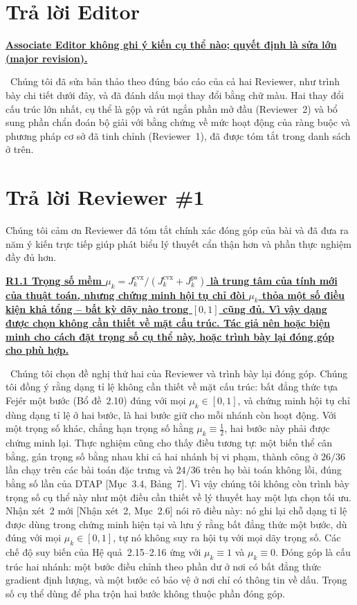 \documentclass[11pt]{article}
\newcommand{\response}[1]{\smallskip\noindent{\color{blue!60!black}\textbf{Trả lời.}}\ #1\par\medskip}
\newcommand{\loc}[1]{\textcolor{blue!50!black}{[#1]}}
\newenvironment{point}[1]{\medskip\noindent\textbf{\uline{#1}}\par}{\par}
\begin{document}
\section*{Trả lời Editor}

\begin{point}{Associate Editor không ghi ý kiến cụ thể nào; quyết định là sửa lớn (major
revision).}
\response{Chúng tôi đã sửa bản thảo theo đúng báo cáo của cả hai Reviewer,
như trình bày chi tiết dưới đây, và đã đánh dấu mọi thay đổi bằng chữ màu. Hai thay đổi cấu trúc lớn nhất, cụ thể là gộp và rút ngắn phần mở đầu (Reviewer~2) và bổ sung phần chẩn đoán bộ giải với bằng chứng về mức hoạt động của ràng buộc và phương pháp cơ sở đã tinh chỉnh (Reviewer~1), đã được tóm tắt trong danh sách ở trên.}
\end{point}

\section*{Trả lời Reviewer \#1}

\noindent Chúng tôi cảm ơn Reviewer đã tóm tắt chính xác đóng góp của bài và đã đưa ra năm
ý kiến trực tiếp giúp phát biểu lý thuyết cẩn thận hơn và phần thực nghiệm
đầy đủ hơn.

\begin{point}{R1.1 Trọng số mềm $\mu_k=J_k^{\mathrm{cvx}}/(J_k^{\mathrm{cvx}}+J_k^{\mathrm{ps}})$
là trung tâm của tính mới của thuật toán, nhưng chứng minh hội tụ chỉ đòi $\mu_k$
thỏa một số điều kiện khả tổng -- bất kỳ dãy nào trong $[0,1]$ cũng đủ. Vì vậy dạng
được chọn không cần thiết về mặt cấu trúc. Tác giả nên hoặc biện minh cho cách đặt trọng số
cụ thể này, hoặc trình bày lại đóng góp cho phù hợp.}
\response{Chúng tôi chọn đề nghị thứ hai của Reviewer và trình bày lại đóng góp.
Chúng tôi đồng ý rằng dạng tỉ lệ không cần thiết về mặt cấu trúc: bất đẳng thức
tựa Fej\'er một bước (Bổ đề~2.10) đúng với mọi $\mu_k\in[0,1]$, và chứng minh hội tụ chỉ dùng dạng tỉ lệ ở hai bước, là hai bước giữ cho mỗi nhánh còn hoạt động. Với một trọng số khác, chẳng hạn trọng số hằng $\mu_k\equiv\tfrac12$, hai bước này phải được chứng minh lại. Thực nghiệm cũng cho thấy điều tương tự: một biến thể cân bằng, gán
trọng số bằng nhau khi cả hai nhánh bị vi phạm, thành công ở $26/36$ lần chạy trên các bài toán
đặc trưng và $24/36$ trên họ bài toán không lồi, đúng bằng số lần của DTAP \loc{Mục~3.4,
Bảng~7}. Vì vậy chúng tôi không còn trình bày trọng số cụ thể này như một điều cần thiết về lý thuyết hay
một lựa chọn tối ưu. Nhận xét~2 mới \loc{Nhận xét~2, Mục~2.6} nói rõ điều này: nó ghi lại chỗ
dạng tỉ lệ được dùng trong chứng minh hiện tại và lưu ý rằng bất đẳng thức một bước,
dù đúng với mọi $\mu_k\in[0,1]$, tự nó không suy ra hội tụ với mọi
dãy trọng số. Các chế độ suy biến của Hệ quả~2.15--2.16 ứng với
$\mu_k\equiv1$ và $\mu_k\equiv0$. Đóng góp là cấu trúc hai nhánh: một bước điều chỉnh theo phần dư ở nơi có bất đẳng thức gradient định lượng, và một bước có bảo vệ ở nơi chỉ có thông tin về dấu. Trọng số cụ thể dùng để pha trộn hai bước không thuộc phần đóng góp.}
\end{point}
\end{document}
